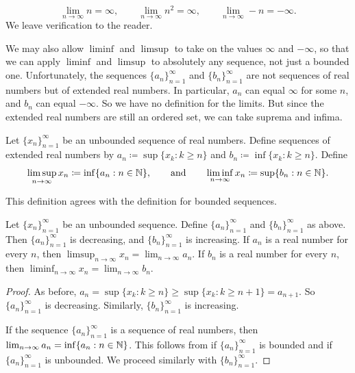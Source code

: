 \begin{example}
\begin{equation*}
\lim_{n\to \infty} n = \infty,
\qquad
\lim_{n\to \infty} n^2 = \infty,
\qquad
\lim_{n\to \infty} -n = -\infty.
\end{equation*}
We leave verification to the reader.
\end{example}

We may also allow $\liminf$ and $\limsup$ to take on
the values $\infty$ and $-\infty$, so that
we can apply $\liminf$ and $\limsup$
to absolutely any sequence, not just
a bounded one.   Unfortunately, the sequences $\{ a_n \}_{n=1}^\infty$ and
$\{ b_n \}_{n=1}^\infty$
are not sequences of real numbers but of extended real numbers.  In
particular, $a_n$ can equal $\infty$ for some $n$, and $b_n$ can equal
$-\infty$.  So we have no definition for the limits.
But since the extended real numbers are still an ordered set, we
can take suprema and infima.

\begin{defn}
Let $\{ x_n \}_{n=1}^\infty$ be an unbounded sequence of real numbers.  Define
sequences of extended real numbers by
$a_n \coloneqq \sup \{ x_k : k \geq n \}$ and
$b_n \coloneqq \inf \{ x_k : k \geq n \}$.
Define
\begin{equation*}
\limsup_{n \to \infty} x_n \coloneqq \inf \{ a_n : n \in {\mathbb{N}} \}, \qquad \text{and} \qquad
\liminf_{n \to \infty} x_n \coloneqq \sup \{ b_n : n \in {\mathbb{N}} \}.
\end{equation*}
\end{defn}

This definition agrees with the definition for bounded
sequences.

\begin{prop}
Let $\{ x_n \}_{n=1}^\infty$ be an unbounded sequence.  Define
$\{ a_n \}_{n=1}^\infty$ and $\{ b_n \}_{n=1}^\infty$ as above.
Then $\{ a_n \}_{n=1}^\infty$ is decreasing, and $\{ b_n \}_{n=1}^\infty$ is increasing.
If $a_n$ is a real number for every $n$, then
$\limsup_{n\to\infty} x_n = \lim_{n\to\infty} a_n$.
If $b_n$ is a real number for every $n$, then
$\liminf_{n\to\infty} x_n = \lim_{n\to\infty} b_n$.
\end{prop}

\begin{proof}
As before,
$a_n = \sup \{ x_k : k \geq n \} \geq \sup \{ x_k : k \geq n+1 \} =
a_{n+1}$.  So $\{ a_n \}_{n=1}^\infty$ is decreasing. Similarly,
$\{ b_n \}_{n=1}^\infty$ is increasing.

If the sequence $\{ a_n \}_{n=1}^\infty$ is a sequence of real numbers, then
$\lim_{n\to\infty} a_n = \inf \{ a_n : n \in {\mathbb{N}} \}$.  This follows from
 if $\{ a_n \}_{n=1}^\infty$ is bounded and
 if $\{a_n \}_{n=1}^\infty$
is unbounded.  We proceed similarly with $\{ b_n \}_{n=1}^\infty$.
\end{proof}

